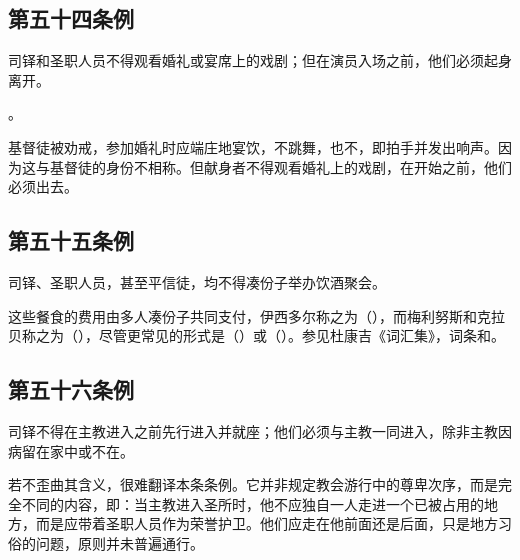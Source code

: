 
\subsection{第五十四条例}

司铎和圣职人员不得观看婚礼或宴席上的戏剧；但在演员入场之前，他们必须起身离开。\par

。\par

基督徒被劝戒，参加婚礼时应端庄地宴饮，不跳舞，也不，即拍手并发出响声。因为这与基督徒的身份不相称。但献身者不得观看婚礼上的戏剧，在开始之前，他们必须出去。\par


\subsection{第五十五条例}

司铎、圣职人员，甚至平信徒，均不得凑份子举办饮酒聚会。\par

这些餐食的费用由多人凑份子共同支付，伊西多尔称之为（），而梅利努斯和克拉贝称之为（），尽管更常见的形式是（）或（）。参见杜康吉《词汇集》，词条和。\par


\subsection{第五十六条例}

司铎不得在主教进入之前先行进入并就座；他们必须与主教一同进入，除非主教因病留在家中或不在。\par

若不歪曲其含义，很难翻译本条条例。它并非规定教会游行中的尊卑次序，而是完全不同的内容，即：当主教进入圣所时，他不应独自一人走进一个已被占用的地方，而是应带着圣职人员作为荣誉护卫。他们应走在他前面还是后面，只是地方习俗的问题，原则并未普遍通行。\par

